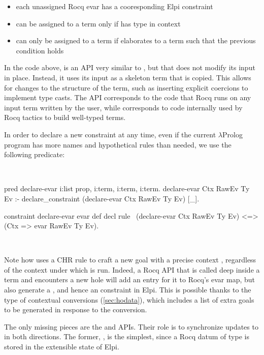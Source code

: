 \documentclass[a4paper, 11pt]{book}
\newenvironment{elpicode}
  {\VerbatimEnvironment~\\\begin{elpibox}\begin{xelpicode}}{\end{xelpicode}
\end{elpibox}\\}
\begin{document}
\begin{itemize}
  \item each unassigned Rocq evar has a cooresponding Elpi constraint
  \item {} can be assigned to a term  only if
         has type  in context 
  \item {} can only be assigned to a term  if
         elaborates to a term  such that
        the previous condition holds
\end{itemize}

\noindent
In the code above,  is an API very similar to
, but that does not modify its input in place. Instead, it
uses its input as a skeleton term that is copied. This allows for changes to
the structure of the term, such as inserting explicit coercions to implement
type casts. The API corresponds to the code that Rocq runs on any input term
written by the user, while  corresponds to code
internally used by Rocq tactics to build well-typed terms.

In order to declare a new  constraint at any time, even if the
current $\lambda$Prolog program has more names and hypothetical rules than
needed, we use the following predicate:

\begin{elpicode}
pred declare-evar i:list prop, i:term, i:term, i:term.
declare-evar Ctx RawEv Ty Ev :-
  declare_constraint (declare-evar Ctx RawEv Ty Ev) [_].

constraint declare-evar evar def decl {
  rule \ (declare-evar Ctx RawEv Ty Ev)
     <=> (Ctx => evar RawEv Ty Ev).
}
\end{elpicode}

\noindent
Note how  uses a CHR rule to craft a new goal with a
precise context , regardless of the context under which
 is run. Indeed, a Rocq API that is called deep
inside a term and encounters a new hole will add an entry for it to Rocq's
evar map, but also generate a , and hence an 
constraint in Elpi. This is possible thanks to the type of contextual
conversions (\cref{sec:hodata}), which includes a list of extra goals to be generated in response
to the conversion.

The only missing pieces are the  and 
APIs. Their role is to synchronize updates to  in both
directions. The former, , is the simplest, since a Rocq
datum of type  is stored in the extensible state of Elpi.
\end{document}
